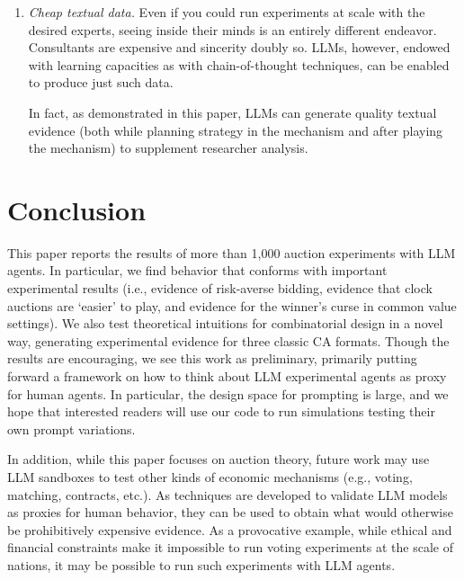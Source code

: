 \documentclass{article} %
\begin{document}
\begin{enumerate}
    \item \textit{Cheap textual data.} Even if you could run experiments at scale with the desired experts, seeing inside their minds is an entirely different endeavor. Consultants are expensive and sincerity doubly so. LLMs, however, endowed with learning capacities as with chain-of-thought techniques, can be enabled to produce just such data.

    In fact, as demonstrated in this paper, LLMs can generate quality textual evidence (both while planning strategy in the mechanism and after playing the mechanism) to supplement researcher analysis. 
\end{enumerate}







\section{Conclusion}
This paper reports the results of more than 1,000 auction experiments with LLM agents. In particular, we find behavior that conforms with important experimental results (i.e., evidence of risk-averse bidding, evidence that clock auctions are `easier' to play, and evidence for the winner's curse in common value settings). We also test theoretical intuitions for combinatorial design in a novel way, generating experimental evidence for three classic CA formats. Though the results are encouraging, we see this work as preliminary,
primarily putting forward a framework on how to think about LLM experimental agents as proxy for human agents.
 In particular, the design space for prompting is large, and we hope that interested readers
 will use our code to run simulations testing their own prompt variations. 

In addition, while this paper focuses on auction theory, future work may use LLM sandboxes to test other  kinds of
economic mechanisms (e.g., voting, matching, contracts, etc.). As techniques are developed to validate LLM models as proxies for human behavior, they can be used to obtain what would otherwise be prohibitively expensive evidence. As a provocative example, while ethical and financial constraints make it impossible to run voting experiments at the scale of nations, it may be possible to run such experiments with LLM agents. 
\end{document}
